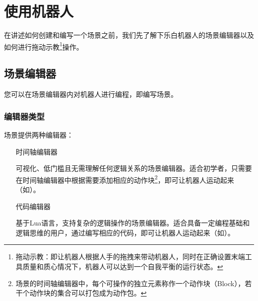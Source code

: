 \chapter{使用机器人}


在讲述如何创建和编写一个场景之前，我们先了解下乐白机器人的场景编辑器以及如何进行拖动示教\footnote{拖动示教：即让机器人根据人手的拖拽来带动机器人，同时在正确设置末端工具质量和质心情况下，机器人可以达到一个自我平衡的运行状态。}操作。


\section{场景编辑器}

您可以在场景编辑器内对机器人进行编程，即编写场景。
\subsection{编辑器类型}

场景提供两种编辑器：
\begin{itemize}[leftmargin=6.5em]
	\item [时间轴编辑器]

	可视化、低门槛且无需理解任何逻辑关系的场景编辑器。适合初学者，只需要在时间轴编辑器中根据需要添加相应的动作块\footnote{场景的时间轴编辑器中，每个可操作的独立元素称作一个动作块（Block），若干个动作块的集合可以打包成为动作包。}，即可让机器人运动起来（如）。

	\item [代码编辑器]

	基于Lua语言，支持复杂的逻辑操作的场景编辑器。适合具备一定编程基础和逻辑思维的用户，通过编写相应的代码，即可让机器人运动起来（如）。

\end{itemize}

